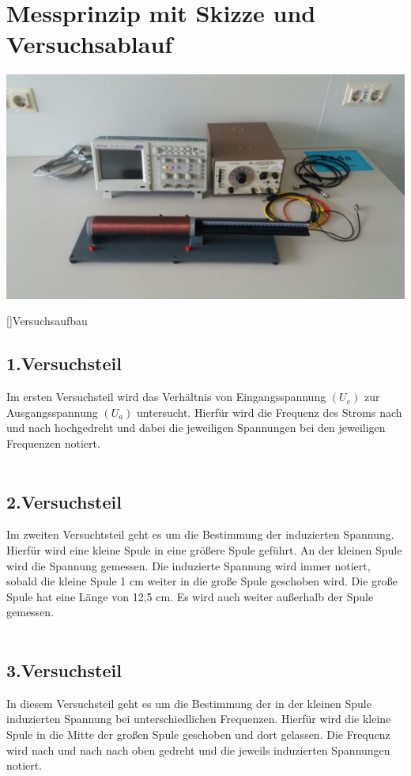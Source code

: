 \chapter{Messprinzip mit Skizze und Versuchsablauf}
\begin{center}
    		\includegraphics[scale=0.25]{Daten/Aufbau.jpeg}
    	\end{center}
    	[]{Versuchsaufbau}
        
        \section{1.Versuchsteil}
        Im ersten Versuchsteil wird das Verhältnis von Eingangsspannung $(U_e)$ zur Ausgangsspannung $(U_a)$ untersucht. Hierfür wird die Frequenz des Stroms nach und nach hochgedreht und dabei die jeweiligen Spannungen bei den jeweiligen Frequenzen notiert.\\
        \\
        \section{2.Versuchsteil}
        Im zweiten Versuchtsteil geht es um die Bestimmung der induzierten Spannung. Hierfür wird eine kleine Spule in eine größere Spule geführt. An der kleinen Spule wird die Spannung gemessen. Die induzierte Spannung wird immer notiert, sobald die kleine Spule 1 cm weiter in die große Spule geschoben wird. Die große Spule hat  eine Länge von 12,5 cm. Es wird auch weiter außerhalb der Spule gemessen.\\
        \\
        \section{3.Versuchsteil}
        In diesem Versuchsteil geht es um die Bestimmung der in der kleinen Spule induzierten Spannung bei unterschiedlichen Frequenzen. Hierfür wird die kleine Spule in die Mitte der großen Spule geschoben und dort gelassen. Die Frequenz wird nach und nach nach oben gedreht und die jeweils induzierten Spannungen notiert.\\
        \\
